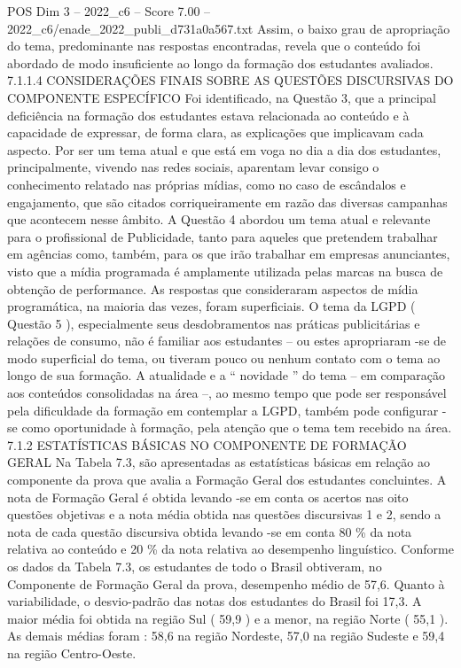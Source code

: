 \begin{textsample}{POS Dim 3 – 2022\_c6 – Score 7.00 – 2022\_c6/enade\_2022\_publi\_d731a0a567.txt}
Assim, o baixo grau de apropriação do tema, predominante nas respostas encontradas, revela que o conteúdo foi abordado de modo insuficiente ao longo da formação dos estudantes avaliados. 7.1.1.4 CONSIDERAÇÕES FINAIS SOBRE AS QUESTÕES DISCURSIVAS DO COMPONENTE ESPECÍFICO Foi identificado, na Questão 3, que a principal deficiência na formação dos estudantes estava relacionada ao conteúdo e à capacidade de expressar, de forma clara, as explicações que implicavam cada aspecto.
Por ser um tema atual e que está em voga no dia a dia dos estudantes, principalmente, vivendo nas redes sociais, aparentam levar consigo o conhecimento relatado nas próprias mídias, como no caso de escândalos e engajamento, que são citados corriqueiramente em razão das diversas campanhas que acontecem nesse âmbito.
A Questão 4 abordou um tema atual e relevante para o profissional de Publicidade, tanto para aqueles que pretendem trabalhar em agências como, também, para os que irão trabalhar em empresas anunciantes, visto que a mídia programada é amplamente utilizada pelas marcas na busca de obtenção de performance.
As respostas que consideraram aspectos de mídia programática, na maioria das vezes, foram superficiais.
O tema da LGPD ( Questão 5 ), especialmente seus desdobramentos nas práticas publicitárias e relações de consumo, não é familiar aos estudantes – ou estes apropriaram -se de modo superficial do tema, ou tiveram pouco ou nenhum contato com o tema ao longo de sua formação.
A atualidade e a “ novidade ” do tema – em comparação aos conteúdos consolidadas na área –, ao mesmo tempo que pode ser responsável pela dificuldade da formação em contemplar a LGPD, também pode configurar -se como oportunidade à formação, pela atenção que o tema tem recebido na área. 7.1.2 ESTATÍSTICAS BÁSICAS NO COMPONENTE DE FORMAÇÃO GERAL Na Tabela 7.3, são apresentadas as estatísticas básicas em relação ao componente da prova que avalia a Formação Geral dos estudantes concluintes.
A nota de Formação Geral é obtida levando -se em conta os acertos nas oito questões objetivas e a nota média obtida nas questões discursivas 1 e 2, sendo a nota de cada questão discursiva obtida levando -se em conta 80 \% da nota relativa ao conteúdo e 20 \% da nota relativa ao desempenho linguístico.
Conforme os dados da Tabela 7.3, os estudantes de todo o Brasil obtiveram, no Componente de Formação Geral da prova, desempenho médio de 57,6.
Quanto à variabilidade, o desvio-padrão das notas dos estudantes do Brasil foi 17,3.
A maior média foi obtida na região Sul ( 59,9 ) e a menor, na região Norte ( 55,1 ).
As demais médias foram : 58,6 na região Nordeste, 57,0 na região Sudeste e 59,4 na região Centro-Oeste.

\end{textsample}

